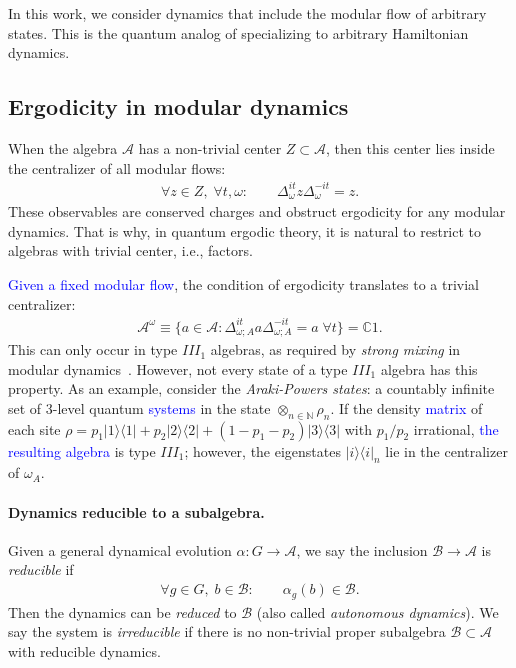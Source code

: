 \documentclass[a4paper,11pt]{article}
\theoremstyle{definition}
\theoremstyle{remark}
\newcommand{\mA}{\mathcal{A}}
\newcommand{\mB}{\mathcal{B}}
\begin{document}
 

 

 
In this work, we consider dynamics that include the modular flow of arbitrary states.
This is the quantum analog of specializing to arbitrary Hamiltonian dynamics.
 
\subsection{Ergodicity in modular dynamics}

When the algebra $\mA$ has a non-trivial center $Z\subset \mA$, then this center lies
inside the centralizer of all modular flows:
\begin{align}
    \forall z\in Z,\;\forall t,\omega:\qquad \Delta_{\omega}^{it}z \Delta_\omega^{-it}=z.
\end{align}
These observables are conserved charges and obstruct ergodicity for any modular
dynamics.  That is why, in quantum ergodic theory, it is natural to restrict to
algebras with trivial center, i.e., factors.
 
\textcolor{blue}{Given a fixed modular flow}, the condition of ergodicity translates to a trivial
centralizer:
\begin{align}
    \mA^\omega\equiv \{a\in \mA:\Delta_{\omega;A}^{it}a\Delta_{\omega;A}^{-it}=a\;\forall t\}=\mathbb{C} 1.
\end{align}
This can only occur in type $III_1$ algebras, as required by \emph{strong mixing} in
modular dynamics~\cite{}.  However, not every state of a type $III_1$ algebra has this
property.  As an example, consider the \emph{Araki-Powers states}: a countably infinite
set of 3-level quantum \textcolor{blue}{systems} in the state $\otimes_{n\in\mathbb{N}}\rho_n$.
If the density \textcolor{blue}{matrix} of each site
$\rho=p_1|1\rangle\langle1|+p_2|2\rangle\langle2|+(1-p_1-p_2)|3\rangle\langle3|$
with $p_1/p_2$ irrational, \textcolor{blue}{the resulting algebra} is type $III_1$; however, the
eigenstates $|i\rangle\langle i|_n$ lie in the centralizer of $\omega_A$.
 

\paragraph{Dynamics reducible to a subalgebra.}
Given a general dynamical evolution $\alpha:G\to\mA$, we say the inclusion $\mB\to\mA$
is \emph{reducible} if
\begin{align}
    \forall g\in G,\;b\in\mB:\qquad \alpha_g(b)\in \mB.
\end{align}
Then the dynamics can be \emph{reduced} to $\mB$ (also called \emph{autonomous
dynamics}).  We say the system is \emph{irreducible} if there is no non-trivial proper
subalgebra $\mB\subset \mA$ with reducible dynamics.
 
\end{document}
